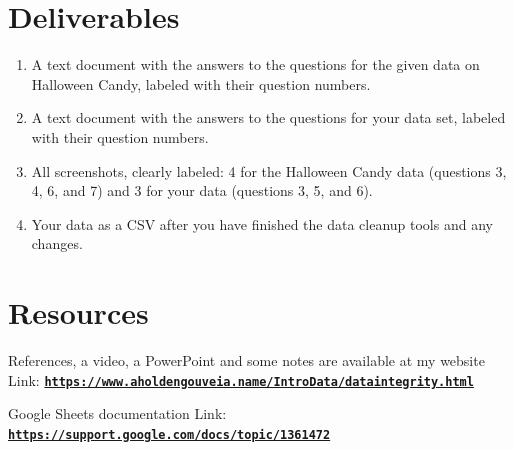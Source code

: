\documentclass[12pt]{article}
\begin{document}
\section*{Deliverables}
\begin{enumerate}
    \item A text document with the answers to the questions for the given data on Halloween Candy, labeled with their question numbers.
    \item A text document with the answers to the questions for your data set, labeled with their question numbers.
    \item All screenshots, clearly labeled: 4 for the Halloween Candy data (questions 3, 4, 6, and 7) and 3 for your data (questions 3, 5, and 6).
    \item Your data as a CSV after you have finished the data cleanup tools and any changes.
\end{enumerate}

\section*{Resources}
References, a video, a PowerPoint and some notes are available at my website
Link: \href{https://www.aholdengouveia.name/IntroData/dataintegrity.html}{\textbf{\nolinkurl{https://www.aholdengouveia.name/IntroData/dataintegrity.html}}}

Google Sheets documentation
Link: \href{https://support.google.com/docs/topic/1361472}{\textbf{\nolinkurl{https://support.google.com/docs/topic/1361472}}}
\end{document}

